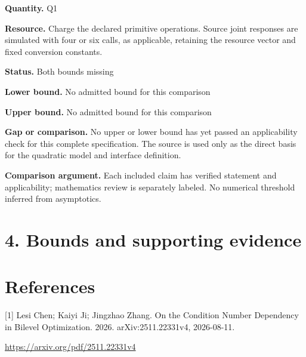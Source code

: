 \documentclass[10pt,a4paper]{article}
\begin{document}
\textbf{Quantity.} Q1

\textbf{Resource.} Charge the declared primitive operations. Source joint responses are simulated with four or six calls, as applicable, retaining the resource vector and fixed conversion constants.

\textbf{Status.} Both bounds missing

\textbf{Lower bound.} No admitted bound for this comparison

\textbf{Upper bound.} No admitted bound for this comparison

\textbf{Gap or comparison.} No upper or lower bound has yet passed an applicability check for this complete specification. The source is used only as the direct basis for the quadratic model and interface definition.

\textbf{Comparison argument.} Each included claim has verified statement and applicability; mathematics review is separately labeled. No numerical threshold inferred from asymptotics.

\section{4. Bounds and supporting evidence}
\section{References}
[1] Lesi Chen; Kaiyi Ji; Jingzhao Zhang. On the Condition Number Dependency in Bilevel Optimization. 2026. arXiv:2511.22331v4, 2026-08-11.

\url{https://arxiv.org/pdf/2511.22331v4}
\end{document}
